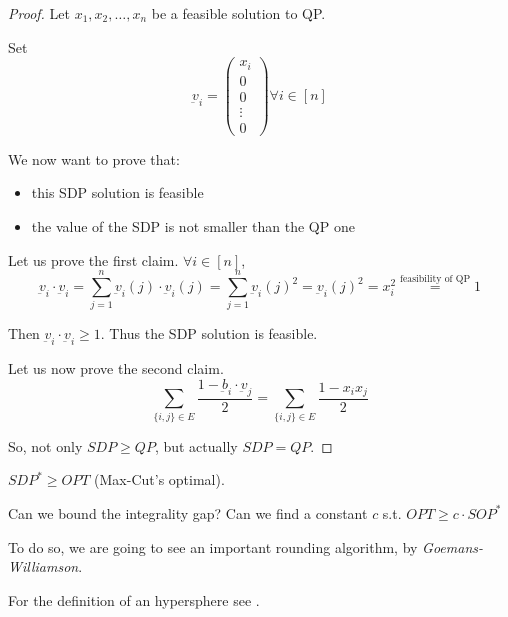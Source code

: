     \begin{proof}
        Let $x_1, x_2, \dots, x_n$ be a feasible solution to QP.\@

        Set
        \begin{equation}
            \underbar{v}_i = 
            \begin{pmatrix}
                x_i\\
                0\\
                0\\
                \vdots\\
                0
            \end{pmatrix}
            \forall i \in [n]
        \end{equation}

        We now want to prove that:
        \begin{itemize}
            \item this SDP solution is feasible
            \item the value of the SDP is not smaller than the QP one
        \end{itemize}

        Let us prove the first claim. $\forall i \in [n]$,
        \[ \underbar{v}_i \cdot \underbar{v}_i = \sum_{j=1}^n \underbar{v}_i(j) \cdot \underbar{v}_i(j) = \sum_{j=1}^{n} \underbar{v}_i(j)^2 = \underbar{v}_i(j)^2 = x_i^2 \overset{\text{feasibility of QP}}{=} 1 \]

        Then $\underbar{v}_i \cdot \underbar{v}_i \geq 1$. Thus the SDP solution is feasible.

        Let us now prove the second claim.
        \[ \sum_{\{i,j\} \in E} \frac{1 - \underbar{b}_i \cdot \underbar{v}_j}{2} = \sum_{\{i,j\} \in E} \frac{1 - x_i x_j}{2} \]

        So, not only $SDP \geq QP$, but actually $SDP = QP$.
    \end{proof}

    \begin{corollary}
        $SDP^* \geq OPT$ (Max-Cut's optimal). 
    \end{corollary}

    Can we bound the integrality gap?
    Can we find a constant $c$ s.t. $OPT \geq c \cdot SOP^*$

    To do so, we are going to see an important rounding algorithm, by \textit{Goemans-Williamson}.

    

    For the definition of an hypersphere see .

